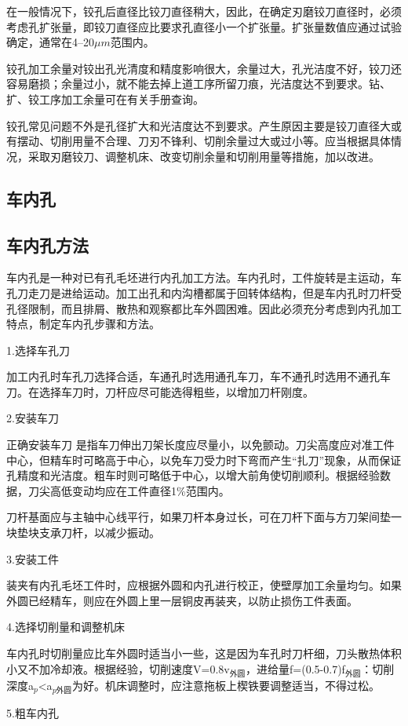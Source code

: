 \documentclass{ctexbook}
\begin{document}
在一般情况下，铰孔后直径比铰刀直径稍大，因此，在确定刃磨铰刀直径时，必须考虑孔扩张量，即铰刀直径应比要求孔直径小一个扩张量。扩张量数值应通过试验确定，通常在4--20$\mu m$范围内。

铰孔加工余量对铰出孔光清度和精度影响很大，余量过大，孔光洁度不好，铰刀还容易磨损；余量过小，就不能去掉上道工序所留刀痕，光洁度达不到要求。钻、扩、铰工序加工余量可在有关手册查询。

铰孔常见问题不外是孔径扩大和光洁度达不到要求。产生原因主要是铰刀直径大或有摆动、切削用量不合理、刀刃不锋利、切削余量过大或过小等。应当根据具体情况，采取刃磨铰刀、调整机床、改变切削余量和切削用量等措施，加以改进。
\subsection{车内孔}
\subsection{车内孔方法}
车内孔是一种对已有孔毛坯进行内孔加工方法。车内孔时，工件旋转是主运动，车孔刀走刀是进给运动。加工出孔和内沟槽都属于回转体结构，但是车内孔时刀杆受孔径限制，而且排屑、散热和观察都比车外圆困难。因此必须充分考虑到内孔加工特点，制定车内孔步骤和方法。

1.选择车孔刀

加工内孔时车孔刀选择合适，车通孔时选用通孔车刀，车不通孔时选用不通孔车刀。在选择车刀时，刀杆应尽可能选得粗些，以增加刀杆刚度。

2.安装车刀

正确安装车刀 是指车刀伸出刀架长度应尽量小，以免颤动。刀尖高度应对准工件中心，但精车时可略高于中心，以免车刀受力时下弯而产生“扎刀”现象，从而保证孔精度和光洁度。粗车时则可略低于中心，以增大前角使切削顺利。根据经验数据，刀尖高低变动均应在工件直径1\%范围内。

刀杆基面应与主轴中心线平行，如果刀杆本身过长，可在刀杆下面与方刀架间垫一块垫块支承刀杆，以减少振动。

3.安装工件

装夹有内孔毛坯工件时，应根据外圆和内孔进行校正，使壁厚加工余量均匀。如果外圆已经精车，则应在外圆上里一层铜皮再装夹，以防止损伤工件表面。

4.选择切削量和调整机床

车内孔时切削量应比车外圆时适当小一些，这是因为车孔时刀杆细，刀头散热体积小又不加冷却液。根据经验，切削速度V=0.8v$_{\text{外圆}}$，进给量f=(0.5-0.7)f$_{\text{外圆}}$：切削深度a$_{p}$<a$_{p外圆}$为好。机床调整时，应注意拖板上楔铁要调整适当，不得过松。

5.粗车内孔
\end{document}
